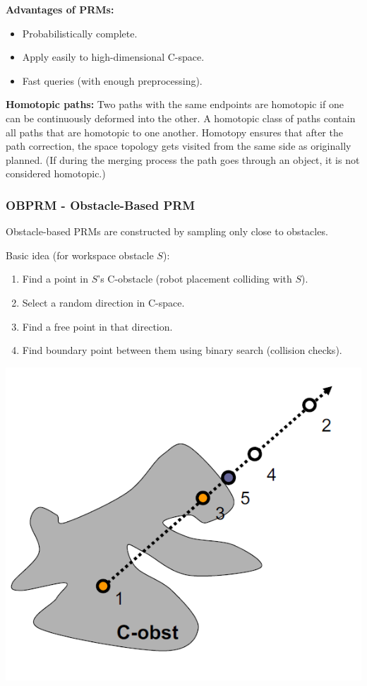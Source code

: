 \begin{multicols*}{2}
\textbf{Advantages of PRMs:}
\begin{itemize}
	\item Probabilistically complete.
	\item Apply easily to high-dimensional C-space.
	\item Fast queries (with enough preprocessing).
\end{itemize}

\textbf{Homotopic paths:} Two paths with the same endpoints are homotopic if one can be continuously deformed into the other.
A homotopic class of paths contain all paths that are homotopic to one another.
Homotopy ensures that after the path correction, the space topology gets visited from the same side as originally planned.
(If during the merging process the path goes through an object, it is not considered homotopic.)

\subsubsection{OBPRM - Obstacle-Based PRM}
Obstacle-based PRMs are constructed by sampling only close to obstacles.\par

Basic idea (for workspace obstacle $S$):
\begin{enumerate}
	\item Find a point in $S$'s C-obstacle (robot placement colliding with $S$).
	\item Select a random direction in C-space.
	\item Find a free point in that direction.
	\item Find boundary point between them using binary search (collision checks).
\end{enumerate}

\begin{center}
\includegraphics[width=0.5\columnwidth]{OBPRM_2}
\end{center}


\end{multicols*}
